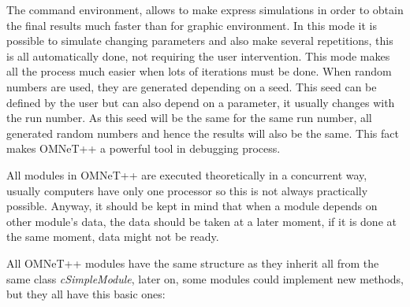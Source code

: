 The command environment, allows to make express simulations in order to obtain the final results much faster than for graphic environment. In this 
mode it is possible to simulate changing parameters and also make several repetitions, this is all automatically done, not requiring the user intervention.
This mode makes all the process much easier when lots of iterations must be done. When random numbers are used, they are generated depending on a seed. 
This seed can be defined by the user but can also depend on a parameter, it usually changes with the run number. As this seed will be the same for the
same run number, all generated random numbers and hence the results will also be the same. This fact makes \ac{OMNeT++} a powerful tool in debugging 
process.

All modules in \ac{OMNeT++} are executed theoretically in a concurrent way, usually computers have only one processor so this is not always
practically possible. Anyway, it should be kept in mind that when a module depends on other module's data, the data should be taken at a 
later moment, if it is done at the same moment, data might not be ready.

All \ac{OMNeT++} modules have the same structure as they inherit all from the same class \textit{cSimpleModule}, later on, some modules could 
implement new methods, but they all have this basic ones:

